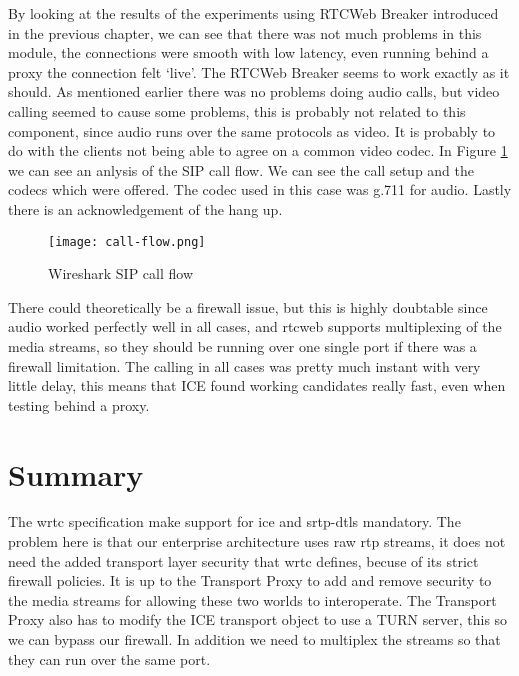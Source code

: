 By looking at the results of the experiments using RTCWeb Breaker introduced in the previous chapter, we can see that there was not much problems in this module, the connections were smooth with low latency, even running behind a proxy the connection felt `live'. The RTCWeb Breaker seems to work exactly as it should. As mentioned earlier there was no problems doing audio calls, but video calling seemed to cause some problems, this is probably not related to this component, since audio runs over the same protocols as video. It is probably to do with the clients not being able to agree on a common video codec. In Figure \ref{fig:wireshark-sip-call-flow} we can see an anlysis of the SIP call flow. We can see the call setup and the codecs which were offered. The codec used in this case was g.711 for audio. Lastly there is an acknowledgement of the hang up.

\begin{figure}[here]
\centerline{\texttt{[image: call-flow.png]}}
\caption{Wireshark SIP call flow}
\label{fig:wireshark-sip-call-flow}
\end{figure}

There could theoretically be a firewall issue, but this is highly doubtable since audio worked perfectly well in all cases, and \gls{rtcweb} supports multiplexing of the media streams, so they should be running over one single port if there was a firewall limitation. The calling in all cases was pretty much instant with very little delay, this means that ICE found working candidates really fast, even when testing behind a proxy.

\section{Summary}
The \gls{wrtc} specification make support for \gls{ice} and \gls{srtp}-{dtls} mandatory. The problem here is that our enterprise architecture uses raw \gls{rtp} streams, it does not need the added transport layer security that \gls{wrtc} defines, becuse of its strict firewall policies. It is up to the Transport Proxy to add and remove security to the media streams for allowing these two worlds to interoperate. The Transport Proxy also has to modify the ICE transport object to use a TURN server, this so we can bypass our firewall. In addition we need to multiplex the streams so that they can run over the same port.
